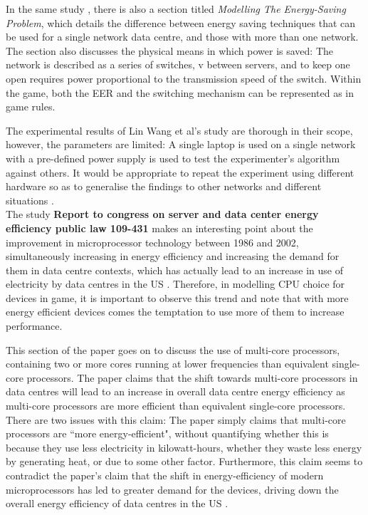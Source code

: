 In the same study \cite{GreenDCN}, there is also a section titled \emph{Modelling The Energy-Saving Problem}, which details the difference between energy saving techniques that can be used for a single network data centre, and those with more than one network. The section also discusses the physical means in which power is saved: The network is described as a series of switches, v between servers, and to keep one open requires power proportional to the transmission speed of the switch. Within the game, both the EER and the switching mechanism can be represented as in game rules.

The experimental results of Lin Wang et al’s study are thorough in their scope, however, the parameters are limited: A single laptop is used on a single network with a pre-defined power supply is used to test the experimenter's algorithm against others. It would be appropriate to repeat the experiment using different hardware so as to generalise the findings to other networks and different situations \cite{GreenDCN}.
\\

The study \textbf{Report to congress on server and data center energy efficiency public law 109-431} \cite{USCongressDataCenterEfficiencyReport} makes an interesting point about the improvement in microprocessor technology between 1986 and 2002, simultaneously increasing in energy efficiency and increasing the demand for them in data centre contexts, which has actually lead to an increase in use of electricity by data centres in the US  \cite[3.1 Expected Energy Savings from Current Energy Efficiency Trends]{USCongressDataCenterEfficiencyReport}. Therefore, in modelling CPU choice for devices in game, it is important to observe this trend and note that with more energy efficient devices comes the temptation to use more of them to increase performance.

This section of the paper goes on to discuss the use of multi-core processors, containing two or more cores running at lower frequencies than equivalent single-core processors. The paper claims that the shift towards multi-core processors in data centres will lead to an increase in overall data centre energy efficiency as multi-core processors are more efficient than equivalent single-core processors. There are two issues with this claim: The paper simply claims that multi-core processors are ``more energy-efficient", without quantifying whether this is because they use less electricity in kilowatt-hours, whether they waste less energy by generating heat, or due to some other factor. Furthermore, this claim seems to contradict the paper's claim that the shift in energy-efficiency of modern microprocessors has led to greater demand for the devices, driving down the overall energy efficiency of data centres in the US \cite[3.1 Expected Energy Savings from Current Energy Efficiency Trends]{USCongressDataCenterEfficiencyReport}.

